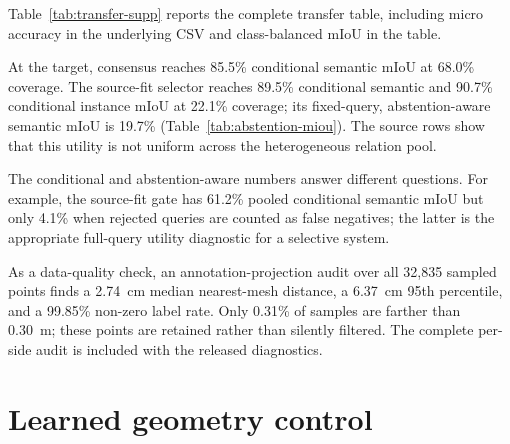 \documentclass[10pt,twocolumn]{article}
\begin{document}
Table~\ref{tab:transfer-supp} reports the complete transfer table, including
micro accuracy in the underlying CSV and class-balanced mIoU in the table.

\begin{table}[t]
\centering
\scriptsize
\resizebox{\columnwidth}{!}{}
\caption{Cross-scan semantic and instance label transfer. The reported mIoU is
conditional and class-balanced over retained query patches; coverage is the
fraction of valid query patches retained by the selector.}
\label{tab:transfer-supp}
\end{table}

At the target, consensus reaches 85.5\% conditional semantic mIoU at 68.0\% coverage.
The source-fit selector reaches 89.5\% conditional semantic and 90.7\%
conditional instance mIoU at 22.1\% coverage; its fixed-query, abstention-aware
semantic mIoU is 19.7\% (Table~\ref{tab:abstention-miou}). The source rows
show that this utility is not uniform across the heterogeneous relation pool.

\begin{table}[t]
\centering
\scriptsize
\resizebox{\columnwidth}{!}{}
\caption{Fixed-query, abstention-aware mIoU. The semantic and instance label
universes are fixed from all non-zero query labels in each split; a rejected
query predicts void and contributes a false negative, while zero-union classes
receive IoU zero.}
\label{tab:abstention-miou}
\end{table}

The conditional and abstention-aware numbers answer different questions. For
example, the source-fit gate has 61.2\% pooled conditional semantic mIoU but
only 4.1\% when rejected queries are counted as false negatives; the latter is
the appropriate full-query utility diagnostic for a selective system.

As a data-quality check, an annotation-projection audit over all 32,835 sampled
points finds a 2.74~cm median nearest-mesh distance, a 6.37~cm 95th percentile,
and a 99.85\% non-zero label rate. Only 0.31\% of samples are farther than
0.30~m; these points are retained rather than silently filtered. The complete
per-side audit is included with the released diagnostics.

\section{Learned geometry control}
\end{document}
